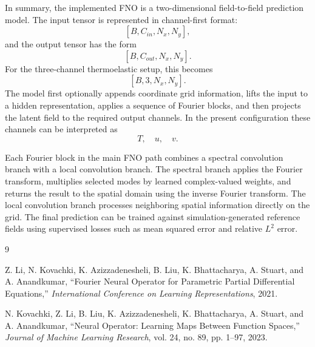 \documentclass[14pt]{extarticle}
\begin{document}
In summary, the implemented FNO is a two-dimensional field-to-field prediction model. The input tensor is represented in channel-first format:
\[
[B, C_{in}, N_x, N_y],
\]
and the output tensor has the form
\[
[B, C_{out}, N_x, N_y].
\]
For the three-channel thermoelastic setup, this becomes
\[
[B, 3, N_x, N_y].
\]
The model first optionally appends coordinate grid information, lifts the input to a hidden representation, applies a sequence of Fourier blocks, and then projects the latent field to the required output channels. In the present configuration these channels can be interpreted as
\[
T, \quad u, \quad v.
\]

Each Fourier block in the main FNO path combines a spectral convolution branch with a local convolution branch. The spectral branch applies the Fourier transform, multiplies selected modes by learned complex-valued weights, and returns the result to the spatial domain using the inverse Fourier transform. The local convolution branch processes neighboring spatial information directly on the grid. The final prediction can be trained against simulation-generated reference fields using supervised losses such as mean squared error and relative \(L^2\) error.

\begin{thebibliography}{9}

Z. Li, N. Kovachki, K. Azizzadenesheli, B. Liu, K. Bhattacharya, A. Stuart, and A. Anandkumar,
``Fourier Neural Operator for Parametric Partial Differential Equations,''
\textit{International Conference on Learning Representations}, 2021.

N. Kovachki, Z. Li, B. Liu, K. Azizzadenesheli, K. Bhattacharya, A. Stuart, and A. Anandkumar,
``Neural Operator: Learning Maps Between Function Spaces,''
\textit{Journal of Machine Learning Research}, vol. 24, no. 89, pp. 1--97, 2023.

\end{thebibliography}
\end{document}
